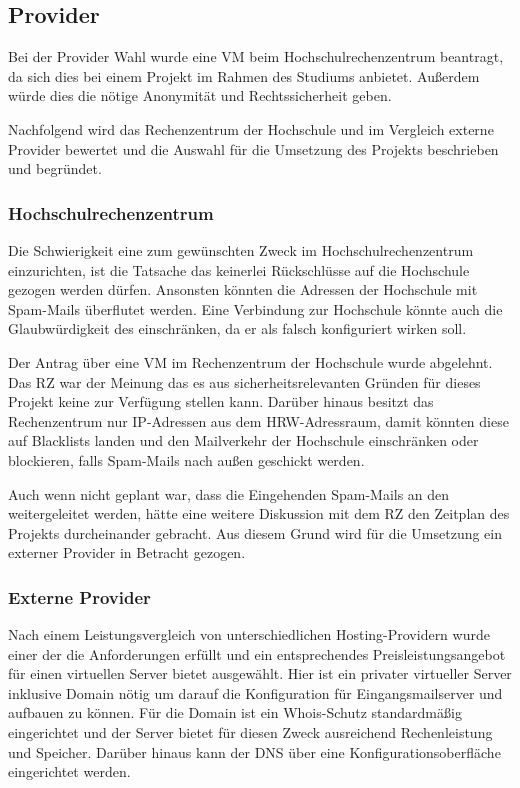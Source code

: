\documentclass[a4paper,11pt,singlespacing]{article}
\begin{document}
	\subsection{Provider}\label{sec:AuswahlLösungProvider}
		Bei der Provider Wahl wurde eine VM beim Hochschulrechenzentrum  beantragt, da sich dies bei einem Projekt im Rahmen des Studiums anbietet. Au{\ss}erdem würde dies die nötige Anonymität und Rechtssicherheit geben.
		
		Nachfolgend wird das Rechenzentrum der Hochschule und im Vergleich externe Provider bewertet und die Auswahl für die Umsetzung des Projekts beschrieben und begründet.
		
		\subsubsection{Hochschulrechenzentrum}\label{sec:AuswahlLösungDMZHochschulrechenzentrum}
			Die Schwierigkeit eine  zum gewünschten Zweck im Hochschulrechenzentrum einzurichten, ist die Tatsache das keinerlei Rückschlüsse auf die Hochschule gezogen werden dürfen. Ansonsten könnten die Adressen der Hochschule mit Spam-Mails überflutet werden. Eine Verbindung zur Hochschule könnte auch die Glaubwürdigkeit des  einschränken, da er als falsch konfiguriert wirken soll.
			
			Der Antrag über eine VM im Rechenzentrum der Hochschule wurde abgelehnt. Das RZ war der Meinung das es aus sicherheitsrelevanten Gründen für dieses Projekt keine  zur Verfügung stellen kann. Darüber hinaus besitzt das Rechenzentrum nur IP-Adressen aus dem HRW-Adressraum, damit könnten diese auf Blacklists landen und den Mailverkehr der Hochschule einschränken oder blockieren, falls Spam-Mails nach au{\ss}en geschickt werden.
			
			Auch wenn nicht geplant war, dass die Eingehenden Spam-Mails an den  weitergeleitet werden, hätte eine weitere Diskussion mit dem RZ den Zeitplan des Projekts durcheinander gebracht. Aus diesem Grund wird für die Umsetzung ein externer Provider in Betracht gezogen.
		
		\subsubsection{Externe Provider}\label{sec:AuswahlLösungExterneProvider}
			Nach einem Leistungsvergleich von unterschiedlichen Hosting-Providern wurde einer der die Anforderungen erfüllt und ein entsprechendes Preisleistungsangebot für einen virtuellen Server bietet ausgewählt.
			Hier ist ein privater virtueller Server inklusive Domain nötig um darauf die Konfiguration für Eingangsmailserver und  aufbauen zu können.
			Für die Domain ist ein Whois-Schutz standardmä{\ss}ig eingerichtet und der Server bietet für diesen Zweck ausreichend Rechenleistung und Speicher. Darüber hinaus kann der DNS über eine Konfigurationsoberfläche eingerichtet werden.		
\end{document}
